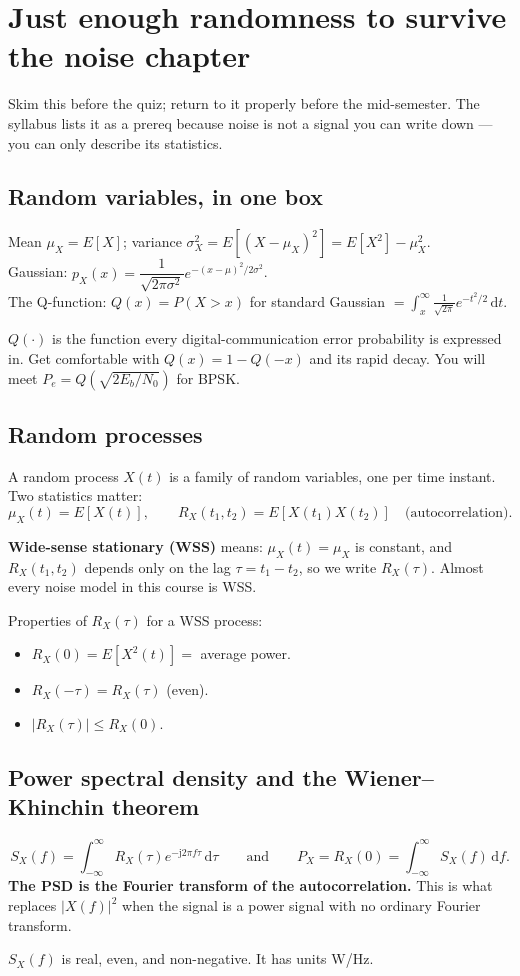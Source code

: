 \documentclass[11pt,a4paper]{article}
\newcommand{\dd}{\,\mathrm{d}}
\newcommand{\ii}{\mathrm{j}}
\begin{document}
\section{Just enough randomness to survive the noise chapter}

Skim this before the quiz; return to it properly before the mid-semester. The syllabus lists it as a prereq
because noise is not a signal you can write down --- you can only describe its statistics.

\subsection{Random variables, in one box}
\begin{keybox}
Mean $\mu_X=E[X]$; variance $\sigma_X^2=E[(X-\mu_X)^2]=E[X^2]-\mu_X^2$.\\
Gaussian: $p_X(x)=\dfrac{1}{\sqrt{2\pi\sigma^2}}e^{-(x-\mu)^2/2\sigma^2}$.\\
The Q-function: $Q(x)=P(X>x)$ for standard Gaussian $=\displaystyle\int_x^\infty\frac{1}{\sqrt{2\pi}}e^{-t^2/2}\dd t$.
\end{keybox}
$Q(\cdot)$ is the function every digital-communication error probability is expressed in. Get comfortable with
$Q(x)=1-Q(-x)$ and its rapid decay. You will meet $P_e=Q\!\left(\sqrt{2E_b/N_0}\right)$ for BPSK.

\subsection{Random processes}
A random process $X(t)$ is a family of random variables, one per time instant. Two statistics matter:
\[
\mu_X(t)=E[X(t)],\qquad R_X(t_1,t_2)=E[X(t_1)X(t_2)]\quad\text{(autocorrelation)}.
\]

\textbf{Wide-sense stationary (WSS)} means: $\mu_X(t)=\mu_X$ is constant, and $R_X(t_1,t_2)$ depends only on
the lag $\tau=t_1-t_2$, so we write $R_X(\tau)$. Almost every noise model in this course is WSS.

Properties of $R_X(\tau)$ for a WSS process:
\begin{itemize}[nosep,leftmargin=*]
\item $R_X(0)=E[X^2(t)]=$ average power.
\item $R_X(-\tau)=R_X(\tau)$ (even).
\item $|R_X(\tau)|\le R_X(0)$.
\end{itemize}

\subsection{Power spectral density and the Wiener--Khinchin theorem}
\begin{keybox}
\[
\boxed{S_X(f)=\int_{-\infty}^{\infty}R_X(\tau)e^{-\ii2\pi f\tau}\dd\tau}
\qquad\text{and}\qquad
P_X=R_X(0)=\int_{-\infty}^{\infty}S_X(f)\dd f .
\]
\textbf{The PSD is the Fourier transform of the autocorrelation.} This is what replaces $|X(f)|^2$ when the
signal is a power signal with no ordinary Fourier transform.
\end{keybox}
$S_X(f)$ is real, even, and non-negative. It has units W/Hz.
\end{document}
